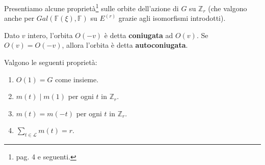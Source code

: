 Presentiamo alcune proprietà\footnote{\cite{cerruti} pag. 4 e seguenti. }
sulle orbite dell'azione di $G$ su $\mathbb{Z}_{r}$ (che valgono anche per $Gal(\mathbb{F}(\xi), \mathbb{F})$ su $E^{(r)}$ grazie agli isomorfismi introdotti).
\begin{definizione}
Dato $v$ intero, l'orbita $O(-v)$ è detta {\bf coniugata} ad $O(v)$. Se $O(v) = O(-v)$, allora l'orbita è detta {\bf autoconiugata}.
\end{definizione}
\begin{prop}\label{cap2:5proporbite}
Valgono le seguenti proprietà:
\begin{enumerate}
   \item $O(1) = G$ come insieme.
   \item $m(t) \mid m(1)$ per ogni $t$ in $\mathbb{Z}_{r}$.
   \item $m(t) = m(-t)$ per ogni $t$ in $\mathbb{Z}_{r}$.
   \item $\sum_{t\in \mathscr{L} } m(t) = r$.
\end{enumerate}
\end{prop}
